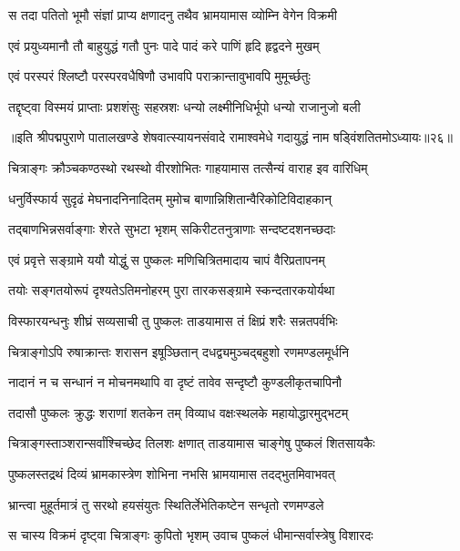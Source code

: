 \twolineshloka
{स तदा पतितो भूमौ संज्ञां प्राप्य क्षणादनु}
{तथैव भ्रामयामास व्योम्नि वेगेन विक्रमी}%

\twolineshloka
{एवं प्रयुध्यमानौ तौ बाहुयुद्धं गतौ पुनः}
{पादे पादं करे पाणिं हृदि हृद्वदने मुखम्}%

\twolineshloka
{एवं परस्परं श्लिष्टौ परस्परवधैषिणौ}
{उभावपि पराक्रान्तावुभावपि मुमूर्च्छतुः}%

\twolineshloka
{तद्दृष्ट्वा विस्मयं प्राप्ताः प्रशशंसुः सहस्रशः}
{धन्यो लक्ष्मीनिधिर्भूपो धन्यो राजानुजो बली}%

॥इति श्रीपद्मपुराणे पातालखण्डे शेषवात्स्यायनसंवादे रामाश्वमेधे गदायुद्धं नाम षड्विंशतितमोऽध्यायः॥२६॥



\twolineshloka
{चित्राङ्गः क्रौञ्चकण्ठस्थो रथस्थो वीरशोभितः}
{गाहयामास तत्सैन्यं वाराह इव वारिधिम्}%

\twolineshloka
{धनुर्विस्फार्य सुदृढं मेघनादनिनादितम्}
{मुमोच बाणान्निशितान्वैरिकोटिविदाहकान्}%

\twolineshloka
{तद्बाणभिन्नसर्वाङ्गाः शेरते सुभटा भृशम्}
{सकिरीटतनुत्राणाः सन्दष्टदशनच्छदाः}%

\twolineshloka
{एवं प्रवृत्ते सङ्ग्रामे ययौ योद्धुं स पुष्कलः}
{मणिचित्रितमादाय चापं वैरिप्रतापनम्}%

\twolineshloka
{तयोः सङ्गतयोरूपं दृश्यतेऽतिमनोहरम्}
{पुरा तारकसङ्ग्रामे स्कन्दतारकयोर्यथा}%

\twolineshloka
{विस्फारयन्धनुः शीघ्रं सव्यसाची तु पुष्कलः}
{ताडयामास तं क्षिप्रं शरैः सन्नतपर्वभिः}%

\twolineshloka
{चित्राङ्गोऽपि रुषाक्रान्तः शरासन इषूञ्छितान्}
{दधद्व्यमुञ्चद्बहुशो रणमण्डलमूर्धनि}%

\twolineshloka
{नादानं न च सन्धानं न मोचनमथापि वा}
{दृष्टं तावेव सन्दृष्टौ कुण्डलीकृतचापिनौ}%

\twolineshloka
{तदासौ पुष्कलः क्रुद्धः शराणां शतकेन तम्}
{विव्याध वक्षःस्थलके महायोद्धारमुद्भटम्}%

\twolineshloka
{चित्राङ्गस्ताञ्शरान्सर्वांश्चिच्छेद तिलशः क्षणात्}
{ताडयामास चाङ्गेषु पुष्कलं शितसायकैः}%

\twolineshloka
{पुष्कलस्तद्रथं दिव्यं भ्रामकास्त्रेण शोभिना}
{नभसि भ्रामयामास तदद्भुतमिवाभवत्}%

\twolineshloka
{भ्रान्त्वा मुहूर्तमात्रं तु सरथो हयसंयुतः}
{स्थितिर्लेभेतिकष्टेन सन्धृतो रणमण्डले}%

\twolineshloka
{स चास्य विक्रमं दृष्ट्वा चित्राङ्गः कुपितो भृशम्}
{उवाच पुष्कलं धीमान्सर्वास्त्रेषु विशारदः}%

